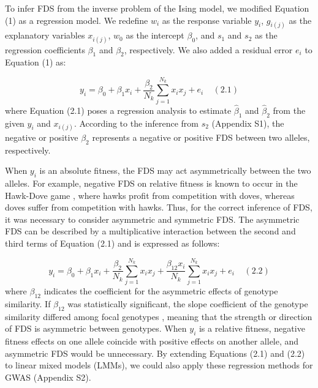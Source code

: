 \documentclass[12pt,]{article}
\begin{document}
To infer FDS from the inverse problem of the Ising model, we modified Equation (1) as a regression model. We redefine $w_i$ as the response variable $y_i$, $g_{i(j)}$ as the explanatory variables $x_{i(j)}$, $w_0$ as the intercept $\beta_0$, and $s_1$ and $s_2$ as the regression coefficients $\beta_1$ and $\beta_2$, respectively. We also added a residual error $e_i$ to Equation (1) as: 

$$y_i = \beta_0 + \beta_1x_i + \frac{\beta_2}{N_k}\sum^{N_{k}}_{j=1}{x_ix_j} + e_i~~~~~(2.1)$$
where Equation (2.1) poses a regression analysis to estimate $\hat{\beta}_1$ and $\hat{\beta}_2$ from the given $y_i$ and $x_{i(j)}$. According to the inference from $s_2$ (Appendix S1), the negative or positive $\beta_2$ represents a negative or positive FDS between two alleles, respectively. 

When $y_i$ is an absolute fitness, the FDS may act asymmetrically between the two alleles. For example, negative FDS on relative fitness is known to occur in the Hawk-Dove game \citep{takahashi2018balanced}, where hawks profit from competition with doves, whereas doves suffer from competition with hawks. Thus, for the correct inference of FDS, it was necessary to consider asymmetric and symmetric FDS. The asymmetric FDS can be described by a multiplicative interaction between the second and third terms of Equation (2.1) \citep{sato2019neighbor} and is expressed as follows:

$$y_i = \beta_0 + \beta_1x_i + \frac{\beta_2}{N_k}\sum^{N_{k}}_{j=1}{x_ix_j} + \frac{\beta_{12}x_i}{N_k}\sum^{N_{k}}_{j=1}{x_ix_j} + e_i~~~~~(2.2)$$
where $\beta_{12}$ indicates the coefficient for the asymmetric effects of genotype similarity. If $\beta_{12}$ was statistically significant, the slope coefficient of the genotype similarity differed among focal genotypes \citep{sato2019neighbor}, meaning that the strength or direction of FDS is asymmetric between genotypes. When $y_i$ is a relative fitness, negative fitness effects on one allele coincide with positive effects on another allele, and asymmetric FDS would be unnecessary. By extending Equations (2.1) and (2.2) to linear mixed models (LMMs), we could also apply these regression methods for GWAS (Appendix S2).
\end{document}
